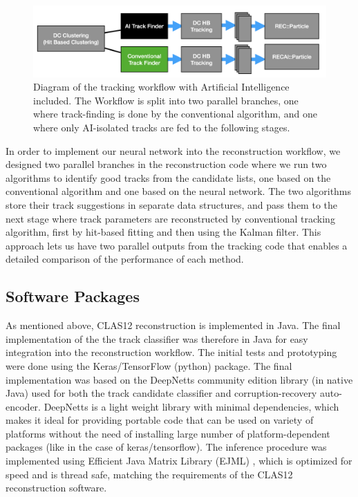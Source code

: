 \begin{figure}[!ht]
\begin{center}
 \includegraphics[width=6.0in]{images/recon_diagram.png}
\caption {Diagram of the tracking workflow with Artificial Intelligence included. The Workflow is split into two parallel branches, one where track-finding is done by the conventional algorithm, and one where only AI-isolated tracks are fed to the following stages.}
 \label{recon:diagram}
 \end{center}
\end{figure}

In order to implement our neural network into the reconstruction workflow, we designed two parallel branches in the reconstruction code where we run 
two algorithms to identify good tracks from the candidate lists, one based on the conventional algorithm and one based on the neural network.
The two algorithms store their track suggestions in separate data structures, and pass them to the next stage where track parameters are reconstructed by 
conventional tracking algorithm, first by hit-based fitting and then using the Kalman filter. This approach lets us have two parallel outputs from the tracking code that enables a detailed comparison of the performance of each method.

\subsection{Software Packages}

As mentioned above, CLAS12 reconstruction is implemented in Java. The final implementation of the the track classifier was therefore in Java for easy integration into the reconstruction workflow. The initial tests and prototyping were done using the Keras/TensorFlow (python) package. The final implementation was based on the DeepNetts \cite{Sevarac.Z} community edition library (in native Java) used for both the track candidate classifier and corruption-recovery auto-encoder. DeepNetts is a light weight library with minimal dependencies, which makes it ideal for providing portable code that can be used on variety of platforms without the need of installing large number of platform-dependent packages (like in the case of keras/tensorflow).
The inference procedure was implemented using Efficient Java Matrix Library (EJML) \cite{ejml:2021}, which is optimized for speed and is thread safe, matching the requirements of the CLAS12 reconstruction software.
